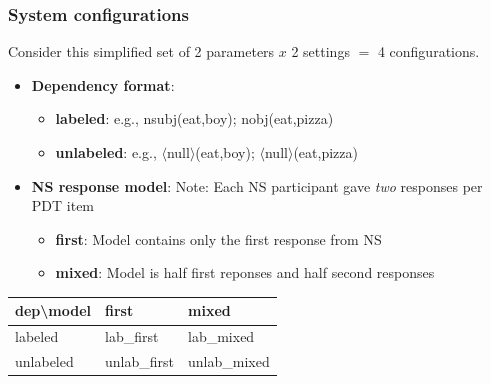 \documentclass[handout,xcolor={dvipsnames}]{beamer}
\begin{document}
\begin{frame}
\frametitle{System configurations}
\small

Consider this simplified set of 2 parameters $x$ 2 settings $=$ 4 configurations.
\medskip

\begin{itemize}
\item \textbf{Dependency format}:
\begin{itemize}
\item \textbf{labeled}: e.g., nsubj(eat,boy); nobj(eat,pizza)
\item \textbf{unlabeled}: e.g., $\langle$null$\rangle$(eat,boy); $\langle$null$\rangle$(eat,pizza)
\end{itemize}
\smallskip

\item \textbf{NS response model}:
Note: Each NS participant gave \textit{two} responses per PDT item
\begin{itemize}
\item \textbf{first}: Model contains only the first response from NS
\item \textbf{mixed}: Model is half first reponses and half second responses
\end{itemize}
\end{itemize}
\begin{table}[htb!]
\small
\begin{center}
\begin{tabular}{|l||l|l|}
\hline
dep\textbackslash model & first & mixed \\
\hline
\hline
labeled & lab\_first & lab\_mixed \\
\hline
unlabeled & unlab\_first & unlab\_mixed \\
\hline
\end{tabular}
\end{center}
\end{table}

\end{frame}
\end{document}
